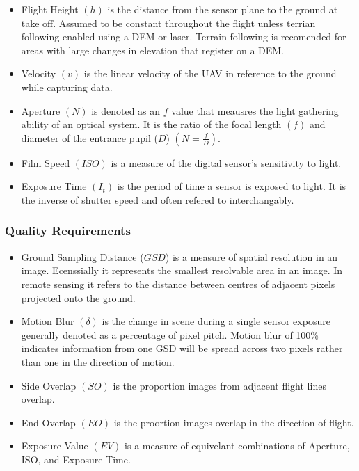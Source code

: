 \documentclass[11pt]{article}
\begin{document}
\begin{itemize}
    \item Flight Height $(h)$ is the distance from the sensor plane to the ground at take off. Assumed to be constant throughout the flight unless terrian following enabled using a DEM or laser. Terrain following is recomended for areas with large changes in elevation that register on a DEM.
    \item Velocity $(v)$ is the linear velocity of the UAV in reference to the ground while capturing data. 
    \item Aperture $(N)$ is denoted as an $f$ value that meausres the light gathering ability of an optical system. It is the ratio of the focal length $(f)$ and diameter of the entrance pupil ($D$) $(N = \frac{f}{D})$.
    \item Film Speed $(ISO)$ is a measure of the digital sensor's sensitivity to light. 
    \item Exposure Time $(I_t)$ is the period of time a sensor is exposed to light. It is the inverse of shutter speed and often refered to interchangably. 
\end{itemize}

\subsubsection{Quality Requirements}

\begin{itemize}
    \item Ground Sampling Distance ($GSD$) is a measure of spatial resolution in an image. Ecenssially it represents the smallest resolvable area in an image. In remote sensing it refers to the distance between centres of adjacent pixels projected onto the ground.
    \item Motion Blur $(\delta)$ is the change in scene during a single sensor exposure generally denoted as a percentage of pixel pitch. Motion blur of 100\% indicates information from one GSD will be spread across two pixels rather than one in the direction of motion. 
    \item Side Overlap $(SO)$ is the proportion images from adjacent flight lines overlap. 
    \item End Overlap $(EO)$ is the proortion images overlap in the direction of flight. 
    \item Exposure Value $(EV)$ is a measure of equivelant combinations of Aperture, ISO, and Exposure Time.
\end{itemize}
\end{document}

